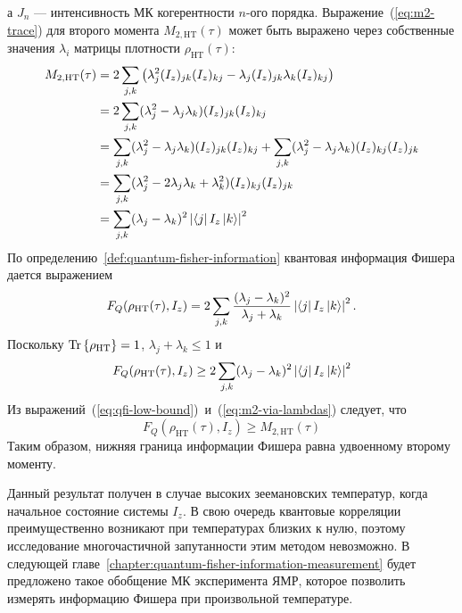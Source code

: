 а $J_n$ --- интенсивность МК когерентности $n$-ого порядка.
%
Выражение~(\ref{eq:m2-trace}) для второго момента $M_{2,\mathrm{HT}}(\tau)$
может быть выражено через собственные значения $\lambda_i$ матрицы плотности $\rho_\mathrm{HT}(\tau)$:
%
\begin{equation}\label{eq:m2-via-lambdas}
\begin{split}
  M_{2,\mathrm{HT}}(\tau)
  &= 2 \sum_{j,k}\left( \lambda^2_j (I_z)_{jk} (I_z)_{kj} - \lambda_j (I_z)_{jk} \lambda_k (I_z)_{kj} \right)
  \\
  &= 2 \sum_{j,k} (\lambda^2_j - \lambda_j \lambda_k) (I_z)_{jk} (I_z)_{kj}
  \\
  &= \sum_{j,k} (\lambda^2_j - \lambda_j \lambda_k) (I_z)_{jk} (I_z)_{kj}
    + \sum_{j,k} (\lambda^2_j - \lambda_j \lambda_k) (I_z)_{kj} (I_z)_{jk}
  \\
  &= \sum_{j,k}
    (\lambda^2_j - 2\lambda_j \lambda_k + \lambda^2_k)
    (I_z)_{kj} (I_z)_{jk}
  \\
  &= \sum_{j,k}
    (\lambda_j - \lambda_k)^2
    \left| \left\langle j \right| I_z \left| k \right\rangle \right|^2
\end{split}
\end{equation}
%
По определению~\ref{def:quantum-fisher-information} квантовая информация Фишера дается выражением
\begin{equation}
    F_Q(\rho_\mathrm{HT}(\tau), I_z) = 2\sum_{j,k} \frac{(\lambda_j - \lambda_k)^2}{\lambda_j + \lambda_k}
    \left| \left\langle j \right| I_z \left| k \right\rangle \right|^2.
\end{equation}
Поскольку $\mathrm{Tr} \left\{ \rho_\mathrm{HT} \right\} = 1$, $\lambda_j + \lambda_k \leq 1$ и
%
\begin{equation}\label{eq:qfi-low-bound}
  F_Q(\rho_\mathrm{HT}(\tau), I_z) \geq 2\sum_{j,k} (\lambda_j - \lambda_k)^2 \left| \left\langle j \right| I_z \left| k \right\rangle \right|^2
\end{equation}
%
Из выражений~(\ref{eq:qfi-low-bound})~и~(\ref{eq:m2-via-lambdas}) следует, что
\begin{equation}
  F_Q(\rho_\mathrm{HT}(\tau), I_z) \geq M_{2,\mathrm{HT}}(\tau)
\end{equation}
%
Таким образом, нижняя граница информации Фишера равна удвоенному второму моменту.

Данный результат получен в случае высоких зеемановских температур,
когда начальное состояние системы $I_z$.
В свою очередь квантовые корреляции преимущественно возникают при температурах близких к нулю,
поэтому исследование многочастичной запутанности этим методом невозможно.
В следующей главе~\ref{chapter:quantum-fisher-information-measurement}
будет предложено такое обобщение МК эксперимента ЯМР,
которое позволить измерять информацию Фишера при произвольной температуре.
